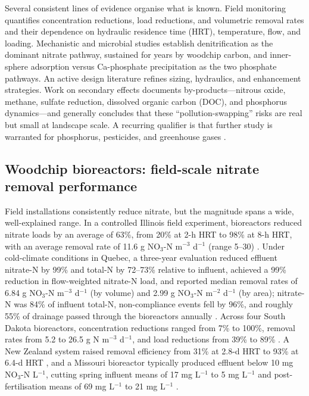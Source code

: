\documentclass[11pt]{article}
\begin{document}
Several consistent lines of evidence organise what is known. Field monitoring quantifies concentration reductions, load reductions, and volumetric removal rates and their dependence on hydraulic residence time (HRT), temperature, flow, and loading. Mechanistic and microbial studies establish denitrification as the dominant nitrate pathway, sustained for years by woodchip carbon, and inner-sphere adsorption versus Ca-phosphate precipitation as the two phosphate pathways. An active design literature refines sizing, hydraulics, and enhancement strategies. Work on secondary effects documents by-products---nitrous oxide, methane, sulfate reduction, dissolved organic carbon (DOC), and phosphorus dynamics---and generally concludes that these ``pollution-swapping'' risks are real but small at landscape scale. A recurring qualifier is that further study is warranted for phosphorus, pesticides, and greenhouse gases \parencite{Mitchell2023}.

\subsection{Woodchip bioreactors: field-scale nitrate removal performance}

Field installations consistently reduce nitrate, but the magnitude spans a wide, well-explained range. In a controlled Illinois field experiment, bioreactors reduced nitrate loads by an average of 63\%, from 20\% at 2-h HRT to 98\% at 8-h HRT, with an average removal rate of 11.6 g NO$_3$-N m$^{-3}$ d$^{-1}$ (range 5--30) \parencite{Bell2015}. Under cold-climate conditions in Quebec, a three-year evaluation reduced effluent nitrate-N by 99\% and total-N by 72--73\% relative to influent, achieved a 99\% reduction in flow-weighted nitrate-N load, and reported median removal rates of 6.84 g NO$_3$-N m$^{-3}$ d$^{-1}$ (by volume) and 2.99 g NO$_3$-N m$^{-2}$ d$^{-1}$ (by area); nitrate-N was 84\% of influent total-N, non-compliance events fell by 96\%, and roughly 55\% of drainage passed through the bioreactors annually \parencite{Husk2017}. Across four South Dakota bioreactors, concentration reductions ranged from 7\% to 100\%, removal rates from 5.2 to 26.5 g N m$^{-3}$ d$^{-1}$, and load reductions from 39\% to 89\% \parencite{Thapa2023}. A New Zealand system raised removal efficiency from 31\% at 2.8-d HRT to 93\% at 6.4-d HRT \parencite{Rivas2020}, and a Missouri bioreactor typically produced effluent below 10 mg NO$_3$-N L$^{-1}$, cutting spring influent means of 17 mg L$^{-1}$ to 5 mg L$^{-1}$ and post-fertilisation means of 69 mg L$^{-1}$ to 21 mg L$^{-1}$ \parencite{Aide2016}.
\end{document}
